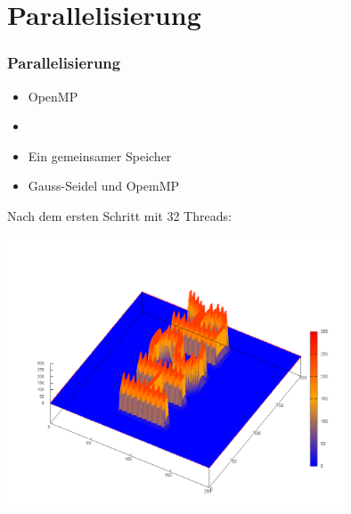 \section{Parallelisierung}

\begin{frame}
\frametitle{Parallelisierung} 
	\begin{itemize}[<+->]
		\item OpenMP
		\item 
		\item Ein gemeinsamer Speicher
		\item Gauss-Seidel und OpemMP
	\end{itemize}
\end{frame}

\begin{frame}
	\centering
	Nach dem ersten Schritt mit 32 Threads:
	
	\includegraphics[width = 10cm]{../skript/images/step001}
\end{frame}
